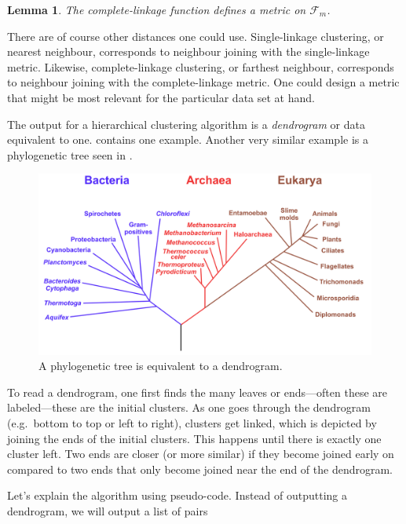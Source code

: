 \documentclass[a4paper, 12pt]{article}
\numberwithin{equation}{section}
\numberwithin{figure}{section}
\newtheorem{lem}[thm]{Lemma}
\theoremstyle{definition}
\begin{document}
\begin{lem}
	The complete-linkage function defines a metric on $\mathscr{F}_m$.
\end{lem}

There are of course other distances one could use. Single-linkage clustering, or
nearest neighbour, corresponds to neighbour joining with the single-linkage
metric. Likewise, complete-linkage clustering, or farthest neighbour,
corresponds to neighbour joining with the complete-linkage metric. One could
design a metric that might be most relevant for the particular data set at hand.

The output for a hierarchical clustering algorithm is a \emph{dendrogram} or
data equivalent to one.  contains one example.
Another very similar example is a phylogenetic tree seen in
.

\begin{figure}[h]
	\centering 
	\includegraphics[scale=0.3]{graphics/Phylogenetic_tree.png}
	\caption{A phylogenetic tree is equivalent to a dendrogram.}
	\label{fig:phylogenetic}
\end{figure}

To read a dendrogram, one first finds the many leaves or ends---often these are
labeled---these are the initial clusters. As one goes through the dendrogram
(e.g.\ bottom to top or left to right), clusters get linked, which is depicted
by joining the ends of the initial clusters. This happens until there is exactly
one cluster left. Two ends are closer (or more similar) if they become joined
early on compared to two ends that only become joined near the end of the
dendrogram. 

Let's explain the algorithm using pseudo-code. Instead of outputting a
dendrogram, we will output a list of pairs 
\end{document}
